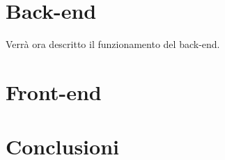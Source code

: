 \documentclass[11pt]{report}
\begin{document}
\section{Back-end}
Verrà ora descritto il funzionamento del back-end.

\section{Front-end}

\section{Conclusioni}
\end{document}
